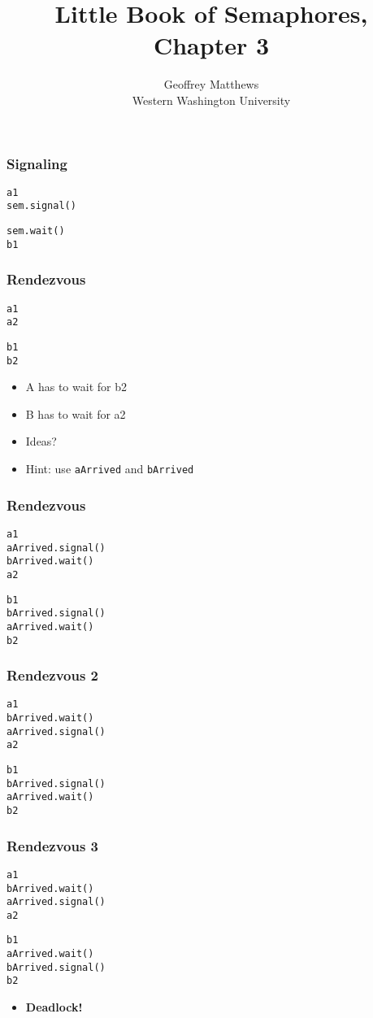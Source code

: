 \documentclass{beamer}
\title{Little Book of Semaphores, Chapter 3}
\author{Geoffrey Matthews\\
\small Western Washington University}
\newcommand{\bi}{\begin{itemize}}
\newcommand{\ii}{\item}
\newcommand{\ei}{\end{itemize}}
\newcommand{\bfr}[1]{\begin{frame}[fragile]\frametitle{{ #1 }}}
\begin{document}
\maketitle

\bfr{Signaling}
\begin{multicols}{2}
\begin{Verbatim}[label=Thread A]
a1
sem.signal()
\end{Verbatim}
\begin{Verbatim}[label=Thread B]
sem.wait()
b1
\end{Verbatim}
\end{multicols}
\end{frame}

\bfr{Rendezvous}
\begin{multicols}{2}
\begin{Verbatim}[label=Thread A]
a1
a2
\end{Verbatim}
\begin{Verbatim}[label=Thread B]
b1
b2
\end{Verbatim}
\end{multicols}
\bi
\ii A has to wait for b2
\ii B has to wait for a2
\ii Ideas?
\pause
\ii Hint: use {\tt aArrived} and {\tt bArrived}
\ei
\end{frame}

\bfr{Rendezvous}
\begin{multicols}{2}
\begin{Verbatim}[label=Thread A]
a1
aArrived.signal()
bArrived.wait()
a2
\end{Verbatim}
\begin{Verbatim}[label=Thread B]
b1
bArrived.signal()
aArrived.wait()
b2
\end{Verbatim}
\end{multicols}
\end{frame}

\bfr{Rendezvous 2}
\begin{multicols}{2}
\begin{Verbatim}[label=Thread A]
a1
bArrived.wait()
aArrived.signal()
a2
\end{Verbatim}
\begin{Verbatim}[label=Thread B]
b1
bArrived.signal()
aArrived.wait()
b2
\end{Verbatim}
\end{multicols}
\end{frame}

\bfr{Rendezvous 3}
\begin{multicols}{2}
\begin{Verbatim}[label=Thread A]
a1
bArrived.wait()
aArrived.signal()
a2
\end{Verbatim}
\begin{Verbatim}[label=Thread B]
b1
aArrived.wait()
bArrived.signal()
b2
\end{Verbatim}
\end{multicols}
\bi
\ii {\bf Deadlock!}
\ei
\end{frame}
\end{document}
